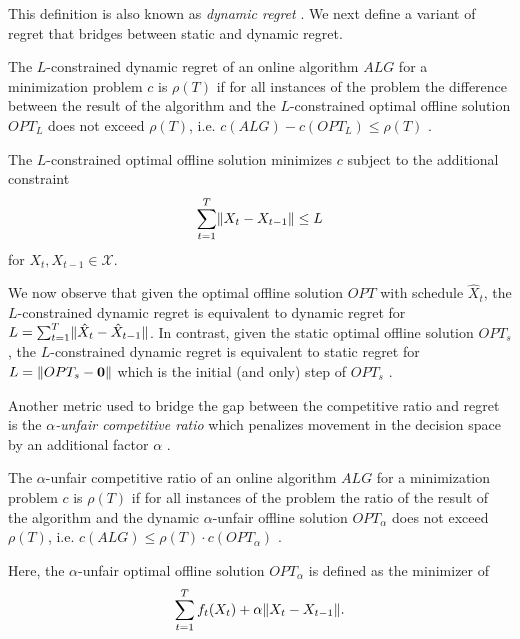 This definition is also known as \emph{dynamic regret} \cite{Chen2018}. We next define a variant of regret that bridges between static and dynamic regret.

\begin{definition}
The $L$-constrained dynamic regret of an online algorithm $ALG$ for a minimization problem $c$ is $\rho(T)$ if for all instances of the problem the difference between the result of the algorithm and the $L$-constrained optimal offline solution $OPT_L$ does not exceed $\rho(T)$, i.e. $c(ALG) - c(OPT_L) \leq \rho(T)$ \cite{Chen2018}.

The $L$-constrained optimal offline solution minimizes $c$ subject to the additional constraint \begin{align*}
    \sum_{t=1}^T \lVert X_t - X_{t-1}\rVert \leq L
\end{align*} for $X_t, X_{t-1} \in \mathcal{X}$.
\end{definition}

We now observe that given the optimal offline solution $OPT$ with schedule $\hat{X}_t$, the $L$-constrained dynamic regret is equivalent to dynamic regret for $L = \sum_{t=1}^T \lVert\hat{X}_t - \hat{X}_{t-1}\rVert$. In contrast, given the static optimal offline solution $OPT_s$, the $L$-constrained dynamic regret is equivalent to static regret for $L = \lVert OPT_s - \mathbf{0}\rVert$ which is the initial (and only) step of $OPT_s$ \cite{Chen2018}.

Another metric used to bridge the gap between the competitive ratio and regret is the \emph{$\alpha$-unfair competitive ratio} which penalizes movement in the decision space by an additional factor $\alpha$ \cite{Andrew2015}.

\begin{definition}
The $\alpha$-unfair competitive ratio of an online algorithm $ALG$ for a minimization problem $c$ is $\rho(T)$ if for all instances of the problem the ratio of the result of the algorithm and the dynamic $\alpha$-unfair offline solution $OPT_{\alpha}$ does not exceed $\rho(T)$, i.e. $c(ALG) \leq \rho(T) \cdot c(OPT_{\alpha})$ \cite{Andrew2015}.

Here, the $\alpha$-unfair optimal offline solution $OPT_{\alpha}$ is defined as the minimizer of \begin{align*}
    \sum_{t=1}^T f_t(X_t) + \alpha \lVert X_t - X_{t-1}\rVert.
\end{align*}
\end{definition}

